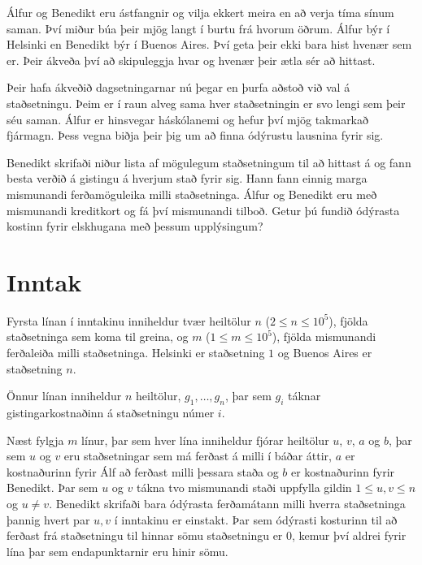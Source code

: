 
Álfur og Benedikt eru ástfangnir og vilja ekkert meira en að verja tíma sínum saman.
Því miður búa þeir mjög langt í burtu frá hvorum öðrum. Álfur býr í Helsinki en
Benedikt býr í Buenos Aires. Því geta þeir ekki bara hist hvenær sem er.
Þeir ákveða því að skipuleggja hvar og hvenær þeir ætla sér að hittast.

Þeir hafa ákveðið dagsetningarnar nú þegar en þurfa aðstoð við val á staðsetningu.
Þeim er í raun alveg sama hver staðsetningin er svo lengi sem þeir séu saman.
Álfur er hinsvegar háskólanemi og hefur því mjög takmarkað fjármagn.
Þess vegna biðja þeir þig um að finna ódýrustu lausnina fyrir sig.

Benedikt skrifaði niður lista af mögulegum staðsetningum til að hittast á
og fann besta verðið á gistingu á hverjum stað fyrir sig.
Hann fann einnig marga mismunandi ferðamöguleika milli staðsetninga.
Álfur og Benedikt eru með mismunandi kreditkort og fá því mismunandi tilboð.
Getur þú fundið ódýrasta kostinn fyrir elskhugana með þessum upplýsingum?

\section*{Inntak}
Fyrsta línan í inntakinu inniheldur tvær heiltölur $n$ ($2 \leq n \leq 10^5$),
fjölda staðsetninga sem koma til greina, og $m$ ($1 \leq m \leq 10^5$),
fjölda mismunandi ferðaleiða milli staðsetninga.
Helsinki er staðsetning $1$ og Buenos Aires er staðsetning $n$.

Önnur línan inniheldur $n$ heiltölur, $g_1, \dotsc, g_n$,
þar sem $g_i$ táknar gistingarkostnaðinn á staðsetningu númer $i$.

Næst fylgja $m$ línur, þar sem hver lína inniheldur fjórar heiltölur $u$, $v$, $a$ og $b$,
þar sem $u$ og $v$ eru staðsetningar sem má ferðast á milli í báðar áttir,
$a$ er kostnaðurinn fyrir Álf að ferðast milli þessara staða og $b$ er kostnaðurinn fyrir Benedikt.
Þar sem $u$ og $v$ tákna tvo mismunandi staði uppfylla gildin $1 \leq u, v \leq n$ og $u \neq v$.
Benedikt skrifaði bara ódýrasta ferðamátann milli hverra staðsetninga þannig hvert par $u, v$ í 
inntakinu er einstakt. Þar sem ódýrasti kosturinn til að ferðast frá staðsetningu til hinnar sömu 
staðsetningu er $0$, kemur því aldrei fyrir lína þar sem endapunktarnir eru hinir sömu.

